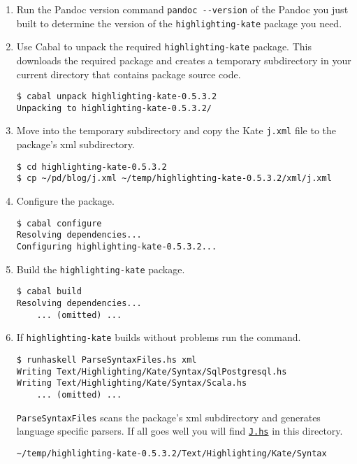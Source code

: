 \begin{enumerate}
\item
  Run the Pandoc version command \texttt{pandoc -{}-version} of the
  Pandoc you just built to determine the version of the
  \texttt{highlighting-kate} package you need.
\item
  Use Cabal to unpack the required \texttt{highlighting-kate} package.
  This downloads the required package and creates a temporary
  subdirectory in your current directory that contains package source
  code.

\begin{verbatim}
$ cabal unpack highlighting-kate-0.5.3.2
Unpacking to highlighting-kate-0.5.3.2/
\end{verbatim}
\item
  Move into the temporary subdirectory and copy the Kate \texttt{j.xml}
  file to the package's xml subdirectory.

\begin{verbatim}
$ cd highlighting-kate-0.5.3.2
$ cp ~/pd/blog/j.xml ~/temp/highlighting-kate-0.5.3.2/xml/j.xml
\end{verbatim}
\item
  Configure the package.

\begin{verbatim}
$ cabal configure
Resolving dependencies...
Configuring highlighting-kate-0.5.3.2...
\end{verbatim}
\item
  Build the \texttt{highlighting-kate} package.

\begin{verbatim}
$ cabal build
Resolving dependencies...
    ... (omitted) ...
\end{verbatim}
\item
  If \texttt{highlighting-kate} builds without problems run the command.

\begin{verbatim}
$ runhaskell ParseSyntaxFiles.hs xml
Writing Text/Highlighting/Kate/Syntax/SqlPostgresql.hs
Writing Text/Highlighting/Kate/Syntax/Scala.hs
    ... (omitted) ...
\end{verbatim}

  \texttt{ParseSyntaxFiles} scans the package's xml subdirectory and
  generates language specific parsers. If all goes well you will find
  \href{https://www.box.com/s/20x4mes7neyj05lppued}{\texttt{J.hs}} in this directory.

\begin{verbatim}
~/temp/highlighting-kate-0.5.3.2/Text/Highlighting/Kate/Syntax
\end{verbatim}


\end{enumerate}
